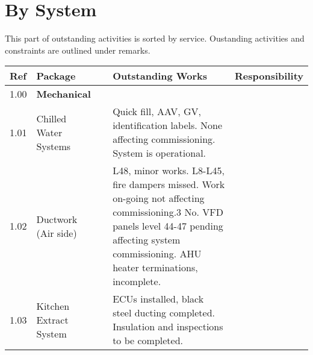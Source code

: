\section{By System}
This part of outstanding activities is sorted by service. Oustanding activities and constraints are outlined under remarks. 
\bigskip

\begin{fullwidth} 
\label{SLsystems}
\RaggedRight
\begin{longtable}{@{}lp{3.5cm}@{}lp{5cm}p{1.5cm}}
\toprule
Ref	&Package	& &Outstanding Works& Responsibility\\
\midrule
1.00	&\textbf{Mechanical}	&	&&\\
1.01	&Chilled Water Systems	&	&Quick fill, AAV, GV, identification labels. None affecting commissioning. System is operational. &\\
1.02	&Ductwork (Air side)  &		& L48, minor works. L8-L45, fire dampers missed. Work on-going not affecting commissioning.3 No. VFD panels level 44-47 pending affecting system commissioning. AHU heater terminations, incomplete.&\\
1.03    &Kitchen Extract System && ECUs installed, black steel ducting completed. Insulation and inspections to be completed.&\\



\end{longtable}
\end{fullwidth}
